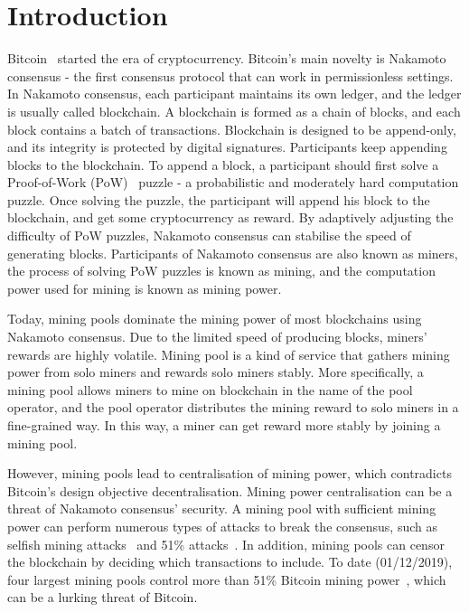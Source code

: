 \section{Introduction}
\label{sec:intro}

Bitcoin~\cite{nakamoto2008bitcoin} started the era of cryptocurrency.
Bitcoin's main novelty is Nakamoto consensus - the first consensus protocol that can work in permissionless settings.
In Nakamoto consensus, each participant maintains its own ledger, and the ledger is usually called blockchain.
A blockchain is formed as a chain of blocks, and each block contains a batch of transactions.
Blockchain is designed to be append-only, and its integrity is protected by digital signatures.
Participants keep appending blocks to the blockchain.
To append a block, a participant should first solve a Proof-of-Work (PoW)~\cite{dwork1992pricing} puzzle - a probabilistic and moderately hard computation puzzle.
Once solving the puzzle, the participant will append his block to the blockchain, and get some cryptocurrency as reward.
By adaptively adjusting the difficulty of PoW puzzles, Nakamoto consensus can stabilise the speed of generating blocks.
Participants of Nakamoto consensus are also known as miners, the process of solving PoW puzzles is known as mining, and the computation power used for mining is known as mining power.

Today, mining pools dominate the mining power of most blockchains using Nakamoto consensus.
Due to the limited speed of producing blocks, miners' rewards are highly volatile.
Mining pool is a kind of service that gathers mining power from solo miners and rewards solo miners stably.
More specifically, a mining pool allows miners to mine on blockchain in the name of the pool operator, and the pool operator distributes the mining reward to solo miners in a fine-grained way.
In this way, a miner can get reward more stably by joining a mining pool.

However, mining pools lead to centralisation of mining power, which contradicts Bitcoin's design objective decentralisation.
Mining power centralisation can be a threat of Nakamoto consensus' security.
A mining pool with sufficient mining power can perform numerous types of attacks to break the consensus, such as selfish mining attacks~\cite{eyal2018majority} and 51\% attacks~\cite{nakamoto2008bitcoin}.
In addition, mining pools can censor the blockchain by deciding which transactions to include.
To date (01/12/2019), four largest mining pools control more than 51\% Bitcoin mining power~\cite{btc-com}, which can be a lurking threat of Bitcoin.




